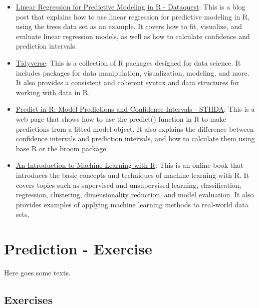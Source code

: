 \documentclass[
]{book}
\providecommand{\tightlist}{%
  \setlength{\itemsep}{0pt}\setlength{\parskip}{0pt}}
\begin{document}
\begin{itemize}
\tightlist
\item
  \href{https://www.dataquest.io/blog/statistical-learning-for-predictive-modeling-r/}{Linear Regression for Predictive Modeling in R - Dataquest}: This is a blog post that explains how to use linear regression for predictive modeling in R, using the trees data set as an example. It covers how to fit, visualize, and evaluate linear regression models, as well as how to calculate confidence and prediction intervals.
\item
  \href{https://www.tidyverse.org/}{Tidyverse}: This is a collection of R packages designed for data science. It includes packages for data manipulation, visualization, modeling, and more. It also provides a consistent and coherent syntax and data structures for working with data in R.
\item
  \href{http://www.sthda.com/english/articles/40-regression-analysis/166-predict-in-r-model-predictions-and-confidence-intervals/}{Predict in R: Model Predictions and Confidence Intervals - STHDA}: This is a web page that shows how to use the predict() function in R to make predictions from a fitted model object. It also explains the difference between confidence intervals and prediction intervals, and how to calculate them using base R or the broom package.
\item
  \href{https://lgatto.github.io/IntroMachineLearningWithR/}{An Introduction to Machine Learning with R}: This is an online book that introduces the basic concepts and techniques of machine learning with R. It covers topics such as supervised and unsupervised learning, classification, regression, clustering, dimensionality reduction, and model evaluation. It also provides examples of applying machine learning methods to real-world data sets.
\end{itemize}

\hypertarget{pm-a}{%
\chapter{Prediction - Exercise}\label{pm-a}}

Here goes some texts.

\hypertarget{exercises-1}{%
\section{Exercises}\label{exercises-1}}
\end{document}
